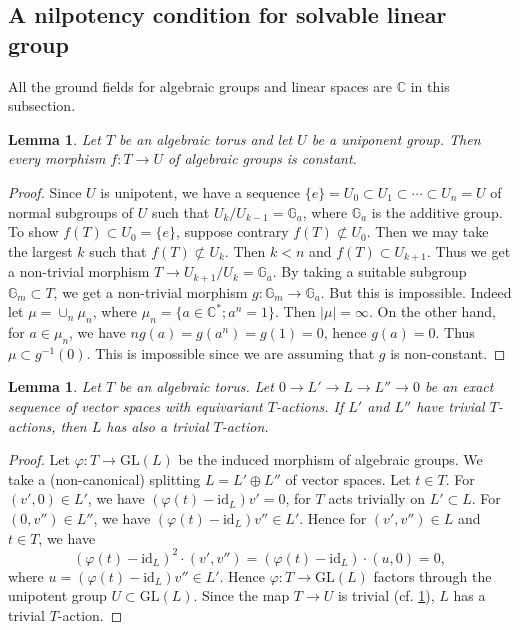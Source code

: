 \documentclass[11pt,english]{smfart}
\theoremstyle{plain}
\newtheorem{lem}[thm]{Lemma}
\theoremstyle{definition}
\theoremstyle{remark}
\numberwithin{equation}{subsection}
\theoremstyle{plain}
\begin{document}
\subsection{A nilpotency condition for solvable linear group} \label{s1}
All the ground fields for algebraic groups and linear spaces are $\mathbb C$ in this subsection.



\begin{lem}  \label{lem:trivial morphism}
		Let $T$ be an algebraic torus and let $U$ be a uniponent group.
		Then every morphism $f:T\to U$ of algebraic groups is constant.
	\end{lem}
\begin{proof}
		Since $U$ is unipotent, we have a sequence $\{e\}=U_0\subset U_1\subset \cdots\subset U_n=U$ of normal subgroups of $U$ such that $U_k/U_{k-1}=\mathbb G_a$, where $\mathbb G_a$ is the additive group.
		To show $f(T)\subset U_0=\{e\}$, suppose contrary $f(T)\not\subset U_0$.
		Then we may take the largest $k$ such that $f(T)\not\subset U_k$.
		Then $k<n$ and $f(T)\subset U_{k+1}$.
		Thus we get a non-trivial morphism $T\to U_{k+1}/U_k=\mathbb G_a$.
		By taking a suitable subgroup $\mathbb G_m\subset T$, we get a non-trivial morphism $g:\mathbb G_m\to \mathbb G_a$. 
		But this is impossible.
		Indeed let $\mu=\cup_n\mu_n$, where $\mu_n=\{ a\in \mathbb C^*;a^n=1\}$.
		Then $|\mu|=\infty$.
		On the other hand, for $a\in \mu_n$, we have $ng(a)=g(a^n)=g(1)=0$, hence $g(a)=0$.
		Thus $\mu\subset g^{-1}(0)$.
		This is impossible since we are assuming that $g$ is non-constant. 
		\end{proof}





\begin{lem}\label{lem:20221012}
Let $T$ be an algebraic torus.
Let $0\to L'\to L\to L''\to 0$ be an exact sequence of vector spaces with equivariant $T$-actions.
If $L'$ and $L''$ have trivial $T$-actions, then $L$ has also a trivial $T$-action.
\end{lem}

\begin{proof}
Let $\varphi:T\to \mathrm{GL}(L)$ be the induced morphism of algebraic groups.
We take a (non-canonical) splitting $L=L'\oplus L''$ of vector spaces.
Let $t\in T$.
For $(v',0)\in L'$, we have $(\varphi(t)-\mathrm{id}_L)v'=0$, for $T$ acts trivially on $L'\subset L$.
For $(0,v'')\in L''$, we have $(\varphi(t)-\mathrm{id}_L)v''\in L'$.
Hence for $(v',v'')\in L$ and $t\in T$, we have 
$$(\varphi(t)-\mathrm{id}_L)^2\cdot (v',v'')=(\varphi(t)-\mathrm{id}_L)\cdot (u,0)=0,$$ where $u=(\varphi(t)-\mathrm{id}_L)v''\in L'$.
Hence $\varphi:T\to \mathrm{GL}(L)$ factors through the unipotent group $U\subset \mathrm{GL}(L)$.
Since the map $T\to U$ is trivial (cf. \cref{lem:trivial morphism}), 
$L$ has a trivial $T$-action.
\end{proof}
\end{document}
